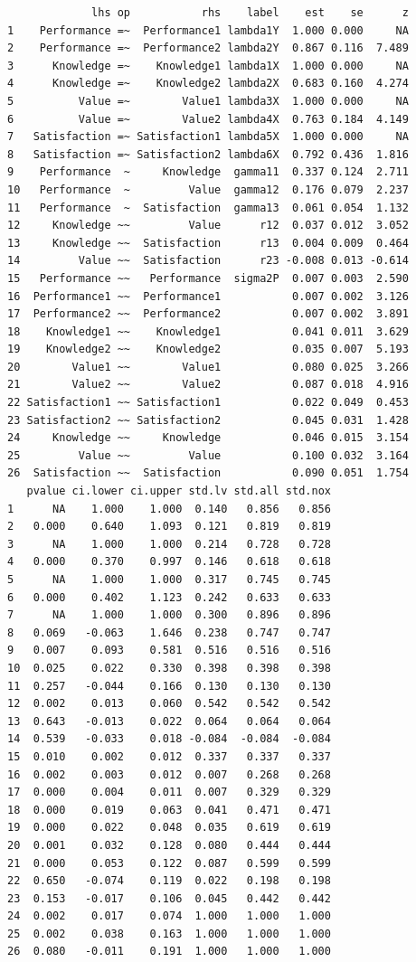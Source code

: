 \begin{verbatim}
             lhs op           rhs    label    est    se      z
1    Performance =~  Performance1 lambda1Y  1.000 0.000     NA
2    Performance =~  Performance2 lambda2Y  0.867 0.116  7.489
3      Knowledge =~    Knowledge1 lambda1X  1.000 0.000     NA
4      Knowledge =~    Knowledge2 lambda2X  0.683 0.160  4.274
5          Value =~        Value1 lambda3X  1.000 0.000     NA
6          Value =~        Value2 lambda4X  0.763 0.184  4.149
7   Satisfaction =~ Satisfaction1 lambda5X  1.000 0.000     NA
8   Satisfaction =~ Satisfaction2 lambda6X  0.792 0.436  1.816
9    Performance  ~     Knowledge  gamma11  0.337 0.124  2.711
10   Performance  ~         Value  gamma12  0.176 0.079  2.237
11   Performance  ~  Satisfaction  gamma13  0.061 0.054  1.132
12     Knowledge ~~         Value      r12  0.037 0.012  3.052
13     Knowledge ~~  Satisfaction      r13  0.004 0.009  0.464
14         Value ~~  Satisfaction      r23 -0.008 0.013 -0.614
15   Performance ~~   Performance  sigma2P  0.007 0.003  2.590
16  Performance1 ~~  Performance1           0.007 0.002  3.126
17  Performance2 ~~  Performance2           0.007 0.002  3.891
18    Knowledge1 ~~    Knowledge1           0.041 0.011  3.629
19    Knowledge2 ~~    Knowledge2           0.035 0.007  5.193
20        Value1 ~~        Value1           0.080 0.025  3.266
21        Value2 ~~        Value2           0.087 0.018  4.916
22 Satisfaction1 ~~ Satisfaction1           0.022 0.049  0.453
23 Satisfaction2 ~~ Satisfaction2           0.045 0.031  1.428
24     Knowledge ~~     Knowledge           0.046 0.015  3.154
25         Value ~~         Value           0.100 0.032  3.164
26  Satisfaction ~~  Satisfaction           0.090 0.051  1.754
   pvalue ci.lower ci.upper std.lv std.all std.nox
1      NA    1.000    1.000  0.140   0.856   0.856
2   0.000    0.640    1.093  0.121   0.819   0.819
3      NA    1.000    1.000  0.214   0.728   0.728
4   0.000    0.370    0.997  0.146   0.618   0.618
5      NA    1.000    1.000  0.317   0.745   0.745
6   0.000    0.402    1.123  0.242   0.633   0.633
7      NA    1.000    1.000  0.300   0.896   0.896
8   0.069   -0.063    1.646  0.238   0.747   0.747
9   0.007    0.093    0.581  0.516   0.516   0.516
10  0.025    0.022    0.330  0.398   0.398   0.398
11  0.257   -0.044    0.166  0.130   0.130   0.130
12  0.002    0.013    0.060  0.542   0.542   0.542
13  0.643   -0.013    0.022  0.064   0.064   0.064
14  0.539   -0.033    0.018 -0.084  -0.084  -0.084
15  0.010    0.002    0.012  0.337   0.337   0.337
16  0.002    0.003    0.012  0.007   0.268   0.268
17  0.000    0.004    0.011  0.007   0.329   0.329
18  0.000    0.019    0.063  0.041   0.471   0.471
19  0.000    0.022    0.048  0.035   0.619   0.619
20  0.001    0.032    0.128  0.080   0.444   0.444
21  0.000    0.053    0.122  0.087   0.599   0.599
22  0.650   -0.074    0.119  0.022   0.198   0.198
23  0.153   -0.017    0.106  0.045   0.442   0.442
24  0.002    0.017    0.074  1.000   1.000   1.000
25  0.002    0.038    0.163  1.000   1.000   1.000
26  0.080   -0.011    0.191  1.000   1.000   1.000
\end{verbatim}

